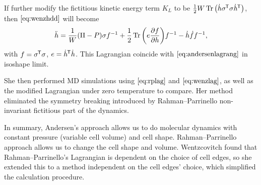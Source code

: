 If further modify the fictitious kinetic energy term $K_L$ to be
$ \frac{ 1 }{ 2 } W \Tr \big( \dot{ h } \sigma^{\mkern-1.5mu\mathsf{T}} \sigma \dot{ h }^{\mkern-1.5mu\mathsf{T}} \big)$,
then $\eqref{eq:wenzhdd}$ will become
\begin{equation}\label{eq:wenzhdd2}
	\ddot{h} = \frac{ 1 }{ W } (\Pi - P) \sigma f^{-1} + \frac{ 1 }{ 2 }
	\Tr \bigg( e \frac{ \partial f }{ \partial h } \bigg) f^{-1}
	- \dot{h} \dot{ f } f^{-1},
\end{equation}
with $f = \sigma ^{\mkern-1.5mu\mathsf{T}} \sigma$, $e = \dot{ h }^{\mkern-1.5mu\mathsf{T}} \dot{ h }$. This
Lagrangian coincide with $\eqref{eq:andersenlagrang}$ in
isoshape limit.

She then performed MD simulations using $\eqref{eq:rplag}$ and
$\eqref{eq:wenzlag}$, as well as the modified Lagrangian under zero
temperature to compare. Her method eliminated the symmetry breaking
introduced by Rahman--Parrinello non-invariant fictitious part of the dynamics.

In summary, Andersen's approach allows us to do molecular dynamics with constant
pressure (variable cell volume) and cell shape. Rahman--Parrinello approach allows us to change the cell shape
and volume. Wentzcovitch found that Rahman--Parrinello's Lagrangian is dependent
on the choice of cell edges, so she extended this to a method independent on
the cell edges' choice, which simplified the calculation procedure.
